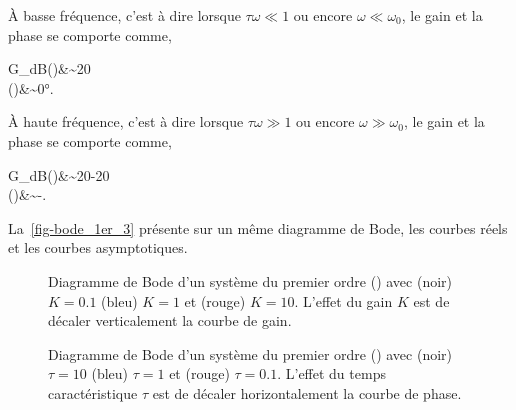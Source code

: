 \`A basse fréquence, c'est à dire lorsque $\tau\omega\ll1$ ou 
encore $\omega\ll\omega_0$, le gain et la phase se comporte comme, 
\begin{bequation}
    G_{dB}(\omega)&\sim20 \\
    \phi(\omega)&\sim0\si{\degree}.
\end{bequation} 
\`A haute fréquence, c'est à dire lorsque $\tau\omega\gg1$ ou 
encore $\omega\gg\omega_0$, le gain et la phase se comporte comme,
\begin{bequation}
    G_{dB}(\omega)&\sim20-20 \\
    \phi(\omega)&\sim-.
\end{bequation} 
La~\cref{fig-bode_1er_3} présente sur un même diagramme de Bode, les courbes 
réels et les courbes asymptotiques.
\begin{figure}[!t]
    \centering
    

    
    \caption{Diagramme de Bode d'un système du premier ordre 
             () avec (noir) $K=0.1$ (bleu) $K=1$ et 
             (rouge) $K=10$. L'effet du gain $K$ est de décaler verticalement 
             la courbe de gain.\label{fig-bode_1er_1}}
\end{figure}
\begin{figure}[!b]
    \centering
    

    
    \caption{Diagramme de Bode d'un système du premier ordre 
             () avec (noir) $\tau=10$ (bleu) $\tau=1$ et 
             (rouge) $\tau=0.1$. L'effet du temps caractéristique $\tau$ est 
             de décaler horizontalement la courbe de phase.
             \label{fig-bode_1er_2}}
\end{figure}
